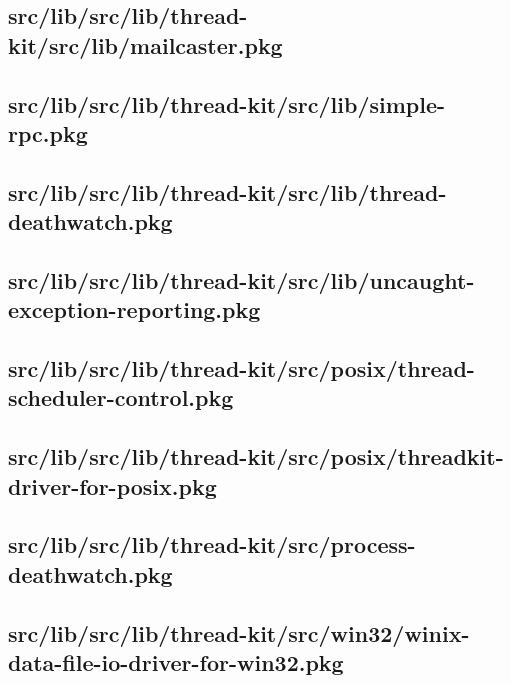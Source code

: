 \subsection{src/lib/src/lib/thread-kit/src/lib/mailcaster.pkg}


\subsection{src/lib/src/lib/thread-kit/src/lib/simple-rpc.pkg}


\subsection{src/lib/src/lib/thread-kit/src/lib/thread-deathwatch.pkg}


\subsection{src/lib/src/lib/thread-kit/src/lib/uncaught-exception-reporting.pkg}


\subsection{src/lib/src/lib/thread-kit/src/posix/thread-scheduler-control.pkg}


\subsection{src/lib/src/lib/thread-kit/src/posix/threadkit-driver-for-posix.pkg}


\subsection{src/lib/src/lib/thread-kit/src/process-deathwatch.pkg}


\subsection{src/lib/src/lib/thread-kit/src/win32/winix-data-file-io-driver-for-win32.pkg}


